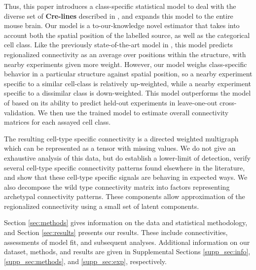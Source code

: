 Thus, this paper introduces a class-specific statistical model to deal with the diverse set of \textbf{Cre-lines} described in \citet{Harris2019-mr}, and expands this model to the entire mouse brain.
Our model is a to-our-knowledge novel estimator that takes into account both the spatial position of the labelled source, as well as the categorical cell class.
Like the previously state-of-the-art model in \citet{Knox2019-ot}, this model predicts regionalized connectivity as an average over positions within the structure, with nearby experiments given more weight.
However, our model weighs class-specific behavior in a particular structure against spatial position, so a nearby experiment specific to a similar cell-class is relatively up-weighted, while a nearby experiment specific to a dissimilar class is down-weighted.
This model outperforms the model of  \citet{Knox2019-ot} based on its ability to predict held-out experiments in leave-one-out cross-validation.
We then use the trained model to estimate overall connectivity matrices for each assayed cell class.

The resulting cell-type specific connectivity is a directed weighted multigraph which can be represented as a tensor with missing values.
We do not give an exhaustive analysis of this data, but do establish a lower-limit of detection, verify several cell-type specific connectivity patterns found elsewhere in the literature, and show that these cell-type specific signals are behaving in expected ways.
We also decompose the wild type connectivity matrix into factors representing archetypal connectivity patterns.
These components allow approximation of the regionalized connectivity using a small set of latent components.

Section \ref{sec:methods} gives information on the data and statistical methodology, and Section \ref{sec:results} presents our results.
These include connectivities, assessments of model fit, and subsequent analyses.
Additional information on our dataset, methods, and results are given in Supplemental Sections \ref{supp_sec:info}, \ref{supp_sec:methods}, and \ref{supp_sec:exp}, respectively.